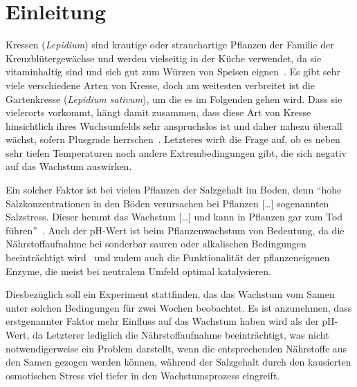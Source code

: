 \section{Einleitung} %
\label{sec:einleitung}
Kressen (\textit{Lepidium}) sind krautige oder strauchartige Pflanzen der Familie der Kreuzblütergewächse und werden vielseitig in der Küche verwendet, da sie vitaminhaltig sind und sich gut zum Würzen von Speisen eignen\ \cite[vgl.][]{web:meinschoenergarten}. Es gibt sehr viele verschiedene Arten von Kresse, doch am weitesten verbreitet ist die Gartenkresse (\textit{Lepidium sativum}), um die es im Folgenden gehen wird. Dass sie vielerorts vorkommt, hängt damit zusammen, dass diese Art von Kresse hinsichtlich ihres Wuchsumfelds sehr anspruchslos ist und daher nahezu überall wächst, sofern Plusgrade herrschen\ \cite[vgl.][]{web:meinschoenergarten}. Letzteres wirft die Frage auf, ob es neben sehr tiefen Temperaturen noch andere Extrembedingungen gibt, die sich negativ auf das Wachstum auswirken.\par
Ein solcher Faktor ist bei vielen Pflanzen der Salzgehalt im Boden, denn ``hohe Salzkonzentrationen in den Böden verursachen bei Pflanzen [\dots] sogenannten Salzstress. Dieser hemmt das Wachstum [\dots] und kann in Pflanzen gar zum Tod führen''\ \cite{web:salzstress}. Auch der pH-Wert ist beim Pflanzenwachstum von Bedeutung, da die Nährstoffaufnahme bei sonderbar sauren oder alkalischen Bedingungen beeinträchtigt wird\ \cite[vgl.][]{web:phwert} und zudem auch die Funktionalität der pflanzeneigenen Enzyme, die meist bei neutralem Umfeld optimal katalysieren.\par
Diesbezüglich soll ein Experiment stattfinden, das das Wachstum vom Samen unter solchen Bedingungen für zwei Wochen beobachtet. Es ist anzunehmen, dass erstgenannter Faktor mehr Einfluss auf das Wachstum haben wird als der pH-Wert, da Letzterer lediglich die Nährstoffaufnahme beeinträchtigt, was nicht notwendigerweise ein Problem darstellt, wenn die entsprechenden Nährstoffe aus den Samen gezogen werden können, während der Salzgehalt durch den kausierten osmotischen Stress viel tiefer in den Wachstumsprozess eingreift.
